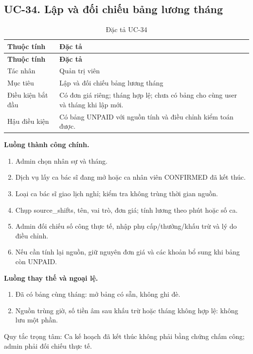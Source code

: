 \clearpage

\subsection{UC-34.\allowbreak{} Lập và đối chiếu bảng lương tháng}
\label{uc:34}

{\small\setlength{\tabcolsep}{3pt}\renewcommand{\arraystretch}{1.12}
\begin{longtable}{@{}L{\textwidth-1.32pt\relax} L{\textwidth-4.68pt\relax}@{}}
\caption{Đặc tả UC-34}\\
\toprule
\textbf{Thuộc tính} & \textbf{Đặc tả}\\\midrule
\endfirsthead
\toprule
\textbf{Thuộc tính} & \textbf{Đặc tả}\\\midrule
\endhead
\bottomrule\endlastfoot
Tác nhân & Quản trị viên\\[3pt]
Mục tiêu & Lập và đối chiếu bảng lương tháng\\[3pt]
Điều kiện bắt đầu & Có đơn giá riêng; tháng hợp lệ; chưa có bảng cho cùng user và tháng khi lập mới.\allowbreak{}\\[3pt]
Hậu điều kiện & Có bảng UNPAID với nguồn tính và điều chỉnh kiểm toán được.\allowbreak{}\\[3pt]
\end{longtable}}
\noindent\textbf{Luồng thành công chính.}
\begin{enumerate}
\item Admin chọn nhân sự và tháng.\allowbreak{}
\item Dịch vụ lấy ca bác sĩ đang mở hoặc ca nhân viên CONFIRMED đã kết thúc.\allowbreak{}
\item Loại ca bác sĩ giao lịch nghỉ; kiểm tra không trùng thời gian nguồn.\allowbreak{}
\item Chụp source\_\allowbreak{}shifts, tên, vai trò, đơn giá; tính lương theo phút hoặc số ca.\allowbreak{}
\item Admin đối chiếu số công thực tế, nhập phụ cấp/\allowbreak{}thưởng/\allowbreak{}khấu trừ và lý do điều chỉnh.\allowbreak{}
\item Nếu cần tính lại nguồn, giữ nguyên đơn giá và các khoản bổ sung khi bảng còn UNPAID.\allowbreak{}
\end{enumerate}
\noindent\textbf{Luồng thay thế và ngoại lệ.}
\begin{enumerate}
\item Đã có bảng cùng tháng:\allowbreak{} mở bảng có sẵn, không ghi đè.\allowbreak{}
\item Nguồn trùng giờ, số tiền âm sau khấu trừ hoặc tháng không hợp lệ:\allowbreak{} không lưu một phần.\allowbreak{}
\end{enumerate}
Quy tắc trọng tâm:\allowbreak{} Ca kế hoạch đã kết thúc không phải bằng chứng chấm công; admin phải đối chiếu thực tế.\allowbreak{}

